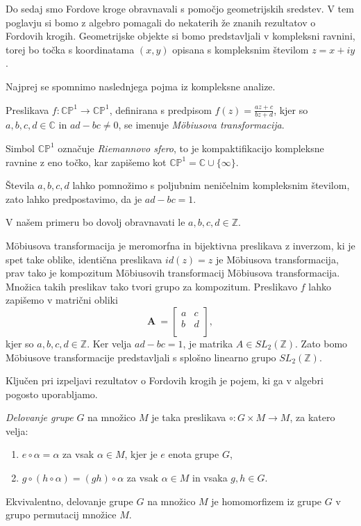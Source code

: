 \documentclass[mat1]{fmfdelo}
\begin{document}
Do sedaj smo Fordove kroge obravnavali s pomočjo geometrijskih sredstev. V tem poglavju si bomo z algebro pomagali do nekaterih že znanih rezultatov o Fordovih krogih.
Geometrijske objekte si bomo predstavljali v kompleksni ravnini, torej bo točka s koordinatama $(x,y)$ opisana s kompleksnim številom $z=x+iy$.

Najprej se spomnimo naslednjega pojma iz kompleksne analize.
\begin{definicija}
\label{def:MobTransformacija}
Preslikava \( f \colon \mathbb{CP}^{1} \rightarrow \mathbb{CP}^{1} \), definirana s predpisom \( f(z) = \frac{az+c}{bz+d} \), kjer so $a,b,c,d \in \mathbb{C}$ in $ad-bc \neq 0$, se imenuje \emph{M\"{o}biusova transformacija}.
\end{definicija} 

\begin{opomba}
Simbol $ \mathbb{CP}^{1}$ označuje \emph{Riemannovo sfero}, to je kompaktifikacijo kompleksne ravnine z eno točko, kar zapišemo kot $\mathbb{CP}^{1} = \mathbb{C} \cup \{\infty\}$.
\end{opomba}

\begin{opomba}
Števila $a,b,c,d$ lahko pomnožimo s poljubnim neničelnim kompleksnim številom, zato lahko predpostavimo, da je $ad-bc=1$.

V našem primeru bo dovolj obravnavati le $a,b,c,d \in \mathbb{Z}$.
\end{opomba}

M\"{o}biusova transformacija je meromorfna in bijektivna preslikava z inverzom, ki je spet take oblike, identična preslikava $id(z)=z$ je M\"{o}biusova transformacija, prav tako je kompozitum M\"{o}biusovih transformacij M\"{o}biusova transformacija. Množica takih preslikav tako tvori grupo za kompozitum. 
Preslikavo $f$ lahko zapišemo v matrični obliki
\[
\mathbf{A}\ =
\left[
\begin{array}{cc}
a & c \\
b & d \\
\end{array}
\right],
\]
kjer so $a,b,c,d \in \mathbb{Z}$. Ker velja $ad-bc=1$, je matrika $A \in {SL}_{2}(\mathbb{Z})$. Zato bomo M\"{o}biusove transformacije predstavljali s splošno linearno grupo ${SL}_{2}(\mathbb{Z})$.

Ključen pri izpeljavi rezultatov o Fordovih krogih je pojem, ki ga v algebri pogosto uporabljamo.

\begin{definicija}
\emph{Delovanje grupe} $G$ na množico $M$ je taka preslikava \( \circ \colon G \times M \rightarrow M \), za katero velja:
\begin{enumerate}
	\item \( e \circ \alpha = \alpha \) za vsak $ \alpha \in M$, kjer je $e$ enota grupe $G$, 
	\item \( g \circ (h \circ \alpha) = (gh) \circ \alpha \) za vsak $\alpha \in M$ in vsaka $g,h \in G$.
\end{enumerate}

Ekvivalentno, delovanje grupe $G$ na množico $M$ je homomorfizem iz grupe $G$ v grupo permutacij množice $M$.
\end{definicija}
\end{document}
